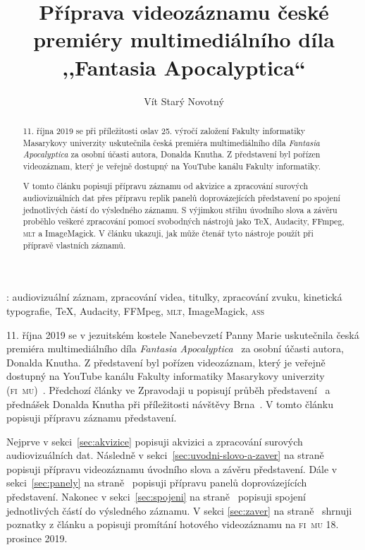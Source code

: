 \documentclass{csbulletin}
\newcommand\vref[1]{\ref{#1} na straně~\pageref{#1}}
\newcommand\acro[1]{\textsc{\MakeLowercase{#1}}}
\begin{document}

\title{Příprava videozáznamu české premiéry multimediálního díla ,,Fantasia Apocalyptica``}
\author{Vít Starý Novotný}
\maketitle[1.5ex]

\begin{abstract}
11. října 2019 se při příležitosti oslav 25. výročí založení Fakulty informatiky Masarykovy univerzity uskutečnila česká premiéra multimediálního díla \emph{Fantasia Apocalyptica} za osobní účasti autora, Donalda Knutha. Z představení byl pořízen videozáznam, který je veřejně dostupný na YouTube kanálu Fakulty informatiky.

V tomto článku popisuji přípravu záznamu od akvizice a zpracování surových audiovizuálních dat přes přípravu replik panelů doprovázejících představení po spojení jednotlivých částí do výsledného záznamu. S výjimkou střihu úvodního slova a závěru proběhlo veškeré zpracování pomocí svobodných nástrojů jako \TeX, Audacity, FFmpeg, \acro{MLT} a ImageMagick. V článku ukazuji, jak může čtenář tyto nástroje použít při přípravě vlastních záznamů.
\end{abstract}
\klicovaslova: audiovizuální záznam, zpracování videa, titulky, zpracování zvuku, kinetická typografie, \TeX, Audacity, FFMpeg, \acro{MLT}, ImageMagick, \acro{ASS}

\bigskip

11. října 2019 se v jezuitském kostele Nanebevzetí Panny Marie uskutečnila česká premiéra multimediálního díla \emph{Fantasia Apocalyptica}~\cite{knuth2023fantasia} za osobní účasti autora, Donalda Knutha. Z představení byl pořízen videozáznam, který je veřejně dostupný na YouTube kanálu Fakulty informatiky Masarykovy univerzity (\acro{FI~MU})~\cite{fimu2020czech}. Předchozí články ve Zpravodaji \CSTUG u popisují průběh představení~\cite{luptak2019fantasia} a přednášek Donalda Knutha při příležitosti návštěvy Brna~\cite{szaniszlo2020dva}. V tomto článku popisuji přípravu záznamu představení.

Nejprve v sekci~\ref{sec:akvizice} popisuji akvizici a zpracování surových audiovizuálních dat. Následně v sekci~\vref{sec:uvodni-slovo-a-zaver} popisuji přípravu videozáznamu úvodního slova a závěru představení. Dále v sekci~\vref{sec:panely} popisuji přípravu panelů doprovázejících představení. Nakonec v sekci~\vref{sec:spojeni} popisuji spojení jednotlivých částí do výsledného záznamu. V sekci \vref{sec:zaver} shrnuji poznatky z článku a popisuji promítání hotového videozáznamu na \acro{FI~MU} 18. prosince 2019.
\end{document}
